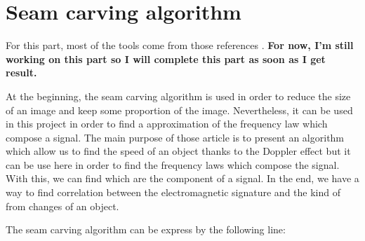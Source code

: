


\chapter{Seam carving algorithm}

For this part, most of the tools come from those references \cite{Doopler1} \cite{Doopler2} \cite{Doopler3}.
\textbf{For now, I'm still working on this part so I will complete this part as soon as I get result.}

At the beginning, the seam carving algorithm is used in order to reduce the size of an image and keep some proportion of the image. Nevertheless, it can be used in this project in order to find a approximation of the frequency law which compose a signal.
The main purpose of those article is to present an algorithm which allow us to find the speed of an object thanks to the Doppler effect but it can be use here in order to find the frequency laws which compose the signal. With this, we can find which are the component of a signal. In the end, we have a way to find correlation between the electromagnetic signature and the kind of from changes of an object.

The seam carving algorithm can be express by the following line:

